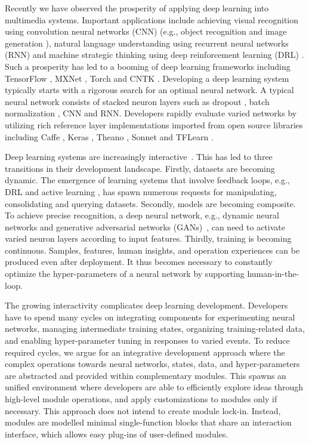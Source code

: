 Recently we have observed the prosperity of applying deep learning into multimedia systems.
Important applications include achieving visual recognition using convolution neural networks (CNN) (e.g., object recognition \cite{krizhevsky2012imagenet} and image generation \cite{radford2015dcgan}), natural language understanding using recurrent neural networks (RNN) \cite{mikolov2010recurrent}
and machine strategic thinking using deep reinforcement learning (DRL) \cite{mnih2015human}.
Such a prosperity has led to a booming of deep learning 
frameworks including TensorFlow \cite{abadi2016tensorflow}, MXNet \cite{chen2015mxnet}, Torch \cite{collobert2002torch} and CNTK \cite{seide2016cntk}.
Developing a deep learning system typically starts with a rigorous search for an optimal neural network. 
A typical neural network consists of stacked neuron layers such as dropout \cite{srivastava2014dropout}, batch normalization \cite{ioffe2015batch}, CNN and RNN. Developers rapidly evaluate varied networks 
by utilizing rich reference layer implementations imported from open source libraries including
Caffe \cite{jia2014caffe}, Keras \cite{chollet2015}, Theano \cite{bergstra2010theano}, Sonnet \cite{sonnet} and TFLearn \cite{tflearn2016}.

Deep learning systems are increasingly interactive~\cite{amershi2014power}. 
This has led to three transitions in their development landscape.
Firstly, datasets are becoming dynamic. The emergence of 
learning systems that involve feedback loops, e.g., DRL and active learning \cite{gal2017deep},
has spawn numerous requests for manipulating, consolidating and querying datasets.
Secondly, models are becoming composite. To achieve precise recognition, a deep neural network, e.g., dynamic neural networks \cite{andreas2016learning} and generative adversarial networks (GANs)~\cite{radford2015dcgan},
can need to activate varied neuron layers according to input features.
Thirdly, training is becoming continuous. Samples, features, 
human insights, and operation experiences 
can be produced even after deployment. 
It thus becomes necessary to constantly optimize the hyper-parameters
of a neural network by supporting human-in-the-loop.

The growing interactivity complicates deep learning development.  
Developers have to spend many 
cycles on integrating components for experimenting neural networks, managing intermediate training states, 
organizing training-related data, and enabling hyper-parameter tuning in responses to varied events. 
To reduce required cycles, we argue for an integrative development approach where 
the complex operations towards neural networks, states, data, and hyper-parameters are abstracted
and provided within complementary modules. 
This spawns an unified environment where developers are able to efficiently explore
ideas through high-level module operations, and apply customizations to modules
only if necessary. This approach does not intend to create module lock-in. Instead,
modules are modelled minimal single-function blocks that share an interaction interface, which
allows easy plug-ins of user-defined modules.


